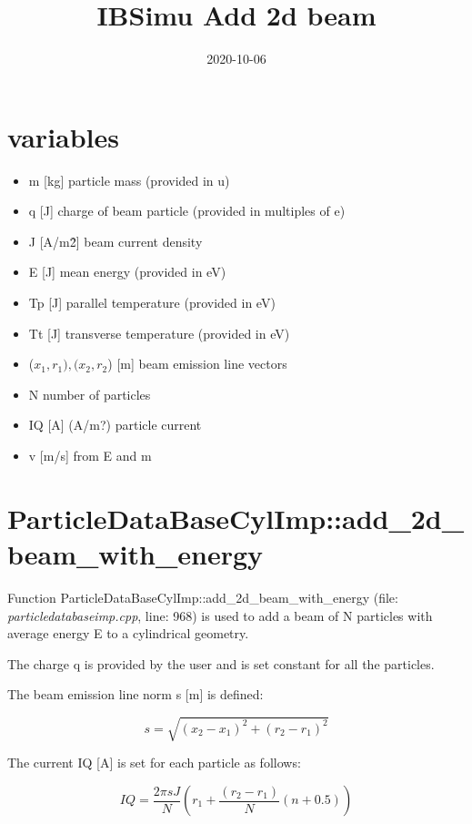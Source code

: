 \documentclass[12pt,a4paper]{article}
\title{IBSimu Add 2d beam}
\date{2020-10-06}
\begin{document}
  \maketitle
  
\section{variables}
\begin{itemize}
	\item m [kg] particle mass (provided in u)
	\item q [J] charge of beam particle (provided in multiples of e)
	\item J [A/m\^2] beam current density
	\item E [J]  mean energy (provided in eV)
	\item Tp [J] parallel temperature (provided in eV)
	\item Tt [J] transverse temperature (provided in eV)
	\item ($x_{1}, r_{1}), (x_{2}, r_{2}$) [m] beam emission line vectors
	\item N number of particles
	\item IQ [A] (A/m?) particle current
	\item v [m/s] from E and m
\end{itemize}

\section{ParticleDataBaseCylImp::add\_2d\_beam\_with\_energy}

Function ParticleDataBaseCylImp::add\_2d\_beam\_with\_energy (file: \textit{particledatabaseimp.cpp}, line: 968) is used to add a beam of N particles with average energy E to a cylindrical geometry.

The charge q is provided by the user and is set constant for all the particles.

The beam emission line norm s [m] is defined:

\begin{equation}
	s = \sqrt{(x_{2}-x_{1})^2+(r_{2}-r_{1})^2}
\end{equation}

The current IQ [A] is set for each particle as follows:

\begin{equation}
	IQ =\frac{2\pi sJ}{N}(r_{1} + \frac{(r_{2}-r_{1})}{N}(n+0.5))
\end{equation}
\end{document}

